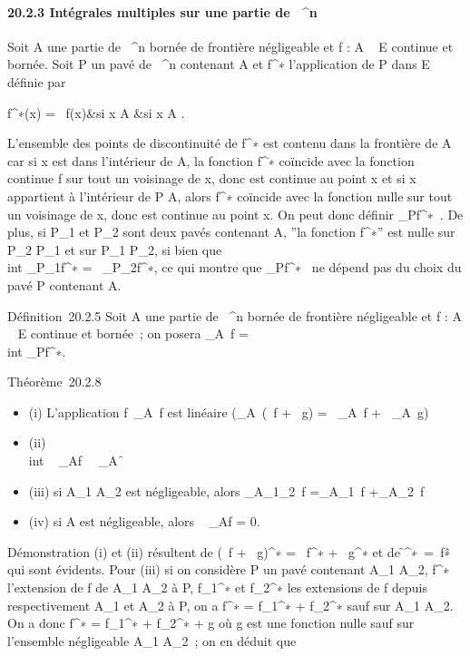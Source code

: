 \documentclass[]{article}
\begin{document}
\paragraph{20.2.3 Intégrales multiples sur une partie de ~^n}

Soit A une partie de ~^n bornée de frontière négligeable et f
: A \rightarrow~ E continue et bornée. Soit P un pavé de ~^n contenant A
et f^∗ l'application de P dans E définie par

 f^∗(x) = \left \
\cases f(x)&si x \in A  &si x \in A
 \right .

L'ensemble des points de discontinuité de f^∗ est contenu
dans la frontière de A car si x est dans l'intérieur de A, la fonction
f^∗ coïncide avec la fonction continue f sur tout un
voisinage de x, donc est continue au point x et si x appartient à
l'intérieur de P \diagdown A, alors f^∗ coïncide avec la fonction
nulle sur tout un voisinage de x, donc est continue au point x. On peut
donc définir \int  _Pf^∗~. De
plus, si P_1 et P_2 sont deux pavés contenant A, ''la
fonction f^∗'' est nulle sur P_2 \diagdown P_1 et
sur P_1 \diagdown P_2, si bien que \\int
 _P_1f^∗ =\int ~
_P_2f^∗, ce qui montre que
\int  _Pf^∗~ ne dépend pas du
choix du pavé P contenant A.

Définition~20.2.5 Soit A une partie de ~^n bornée de
frontière négligeable et f : A \rightarrow~ E continue et bornée~; on posera
\int  _A~f =\\int
 _Pf^∗.

Théorème~20.2.8

\begin{itemize}
\itemsep1pt\parskip0pt
\item
  (i) L'application
  f\mapsto~\int  _A~f
  est linéaire (\int  _A~(\alpha~f + \beta~g) =
  \alpha~\int  _A~f +
  \beta~\int  _A~g)
\item
  (ii) \\int ~
  _Af\ \leq\int ~
  _A\f\
\item
  (iii) si A_1 \bigcap A_2 est négligeable, alors
  \int  _A_1\cupA_2~f
  =\int  _A_1~f
  +\int  _A_2~f
\item
  (iv) si A est négligeable, alors \int ~
  _Af = 0.
\end{itemize}

Démonstration (i) et (ii) résultent de (\alpha~f + \beta~g)^∗ =
\alpha~f^∗ + \beta~g^∗ et de
\f^∗\
=\ f\^∗ qui
sont évidents. Pour (iii) si on considère P un pavé contenant
A_1 \cup A_2, f^∗ l'extension de f de
A_1 \cup A_2 à P, f_1^∗ et
f_2^∗ les extensions de f depuis respectivement
A_1 et A_2 à P, on a f^∗ =
f_1^∗ + f_2^∗ sauf sur A_1 \bigcap
A_2. On a donc f^∗ = f_1^∗ +
f_2^∗ + g où g est une fonction nulle sauf sur
l'ensemble négligeable A_1 \bigcap A_2~; on en déduit que
\end{document}
